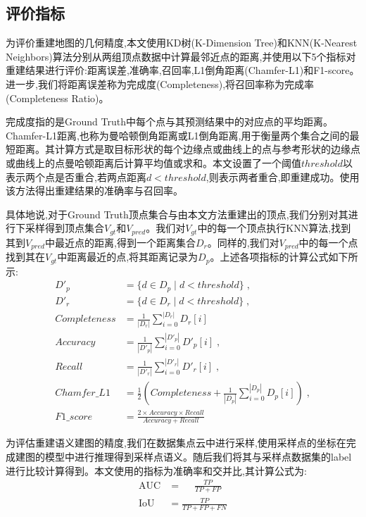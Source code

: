 \subsection{评价指标}\label{metric}
为评价重建地图的几何精度,本文使用KD树\cite{kd}(K-Dimension Tree)和KNN\cite{knn}(K-Nearest Neighbors)算法分别从两组顶点数据中计算最邻近点的距离,并使用以下5个指标对重建结果进行评价:距离误差,准确率,召回率,L1倒角距离(Chamfer-L1)和F1-score。进一步,我们将距离误差称为完成度(Completeness),将召回率称为完成率(Completeness Ratio)。

完成度指的是Ground Truth中每个点与其预测结果中的对应点的平均距离。Chamfer-L1距离,也称为曼哈顿倒角距离或L1倒角距离,用于衡量两个集合之间的最短距离。其计算方式是取目标形状的每个边缘点或曲线上的点与参考形状的边缘点或曲线上的点曼哈顿距离后计算平均值或求和。本文设置了一个阈值$threshold$以表示两个点是否重合,若两点距离$d<threshold$,则表示两者重合,即重建成功。使用该方法得出重建结果的准确率与召回率。

具体地说,对于Ground Truth顶点集合与由本文方法重建出的顶点,我们分别对其进行下采样得到顶点集合$V_{gt}$和$V_{pred}$。我们对$V_{gt}$中的每一个顶点执行KNN算法,找到其到$V_{pred}$中最近点的距离,得到一个距离集合$D_{r}$。同样的,我们对$V_{pred}$中的每一个点找到其在$V_{gt}$中距离最近的点,将其距离记录为$D_{p}$。上述各项指标的计算公式如下所示:
\begin{equation*}
\begin{alignedat}{2}
D'_{p} &= \{d \in D_{p} \mid d < threshold\}\;,\\
D'_{r} &= \{d \in D_r\mid d<threshold\}\;,\\
Completeness &= \frac{1}{|D_{r}|}\sum_{i=0}^{|D_{r}|}D_{r}[i]\;\\
Accuracy&= \frac{1}{|D'_{p}|}\sum_{i=0}^{|D'_{p}|}D'_{p}[i]\;,\\
Recall &=\frac{1}{|D'_{r}|}\sum_{i=0}^{|D'_{r}|}D'_{r}[i]\;,\\
Chamfer\_L1 &= \frac{1}{2}\left(Completeness + \frac{1}{|D_{p}|}\sum_{i=0}^{|D_{p}|}D_{p}[i]\right)\;,\\
F1\_score &= \frac{2\times Accuracy\times Recall}{Accuracy + Recall}
\end{alignedat}
\end{equation*}

为评估重建语义建图的精度,我们在数据集点云中进行采样,使用采样点的坐标在完成建图的模型中进行推理得到采样点语义。随后我们将其与采样点数据集的label进行比较计算得到。本文使用的指标为准确率和交并比,其计算公式为:
\begin{equation*}
    \begin{alignedat}{2}
    \mbox{AUC} &=\quad\;\frac{TP}{TP+FP}\\
    \mbox{IoU} &=\frac{TP}{TP + FP + FN}
    \end{alignedat}
\end{equation*}
